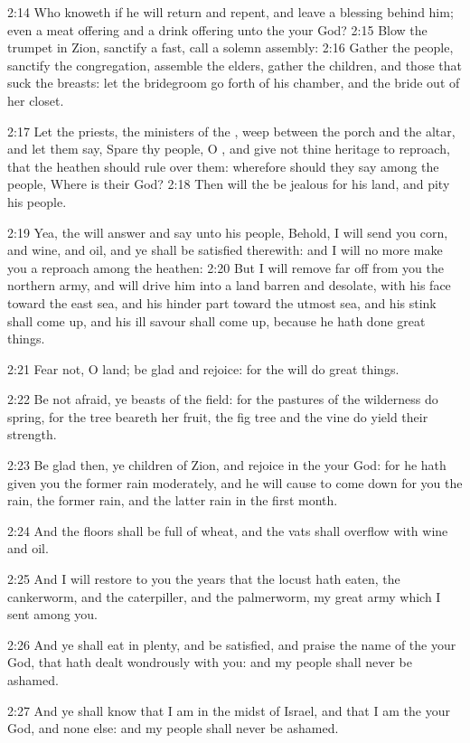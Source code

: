 2:14 Who knoweth if he will return and repent, and leave a blessing behind him; even a meat offering and a drink offering unto the \LORD your God?  2:15 Blow the trumpet in Zion, sanctify a fast, call a solemn assembly: 2:16 Gather the people, sanctify the congregation, assemble the elders, gather the children, and those that suck the breasts: let the bridegroom go forth of his chamber, and the bride out of her closet.

2:17 Let the priests, the ministers of the \LORD, weep between the porch and the altar, and let them say, Spare thy people, O \LORD, and give not thine heritage to reproach, that the heathen should rule over them: wherefore should they say among the people, Where is their God?  2:18 Then will the \LORD be jealous for his land, and pity his people.

2:19 Yea, the \LORD will answer and say unto his people, Behold, I will send you corn, and wine, and oil, and ye shall be satisfied therewith: and I will no more make you a reproach among the heathen: 2:20 But I will remove far off from you the northern army, and will drive him into a land barren and desolate, with his face toward the east sea, and his hinder part toward the utmost sea, and his stink shall come up, and his ill savour shall come up, because he hath done great things.

2:21 Fear not, O land; be glad and rejoice: for the \LORD will do great things.

2:22 Be not afraid, ye beasts of the field: for the pastures of the wilderness do spring, for the tree beareth her fruit, the fig tree and the vine do yield their strength.

2:23 Be glad then, ye children of Zion, and rejoice in the \LORD your God: for he hath given you the former rain moderately, and he will cause to come down for you the rain, the former rain, and the latter rain in the first month.

2:24 And the floors shall be full of wheat, and the vats shall overflow with wine and oil.

2:25 And I will restore to you the years that the locust hath eaten, the cankerworm, and the caterpiller, and the palmerworm, my great army which I sent among you.

2:26 And ye shall eat in plenty, and be satisfied, and praise the name of the \LORD your God, that hath dealt wondrously with you: and my people shall never be ashamed.

2:27 And ye shall know that I am in the midst of Israel, and that I am the \LORD your God, and none else: and my people shall never be ashamed.


